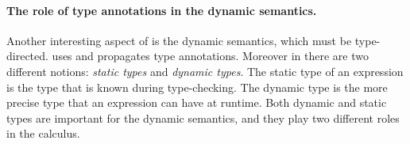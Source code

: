 \begin{comment}
The set representation is justified by the distributivity in subtyping (Figure~\ref{}).
Every type in the set denotes a component in a union type.
That is to say, any inhabited type must have an equivalent union type,
except for literal types.
Only with distributivity, we have $[[(A\/B)/\C]]$ equivalent to
$[[(A/\C)\/(B/\C)]]$.
The soundness and completeness of the algorithmic definition is proved
with respect to the declarative definition.
Same applies to the two definitions for \cal without intersection.


\paragraph{Typing and exhaustiveness}
In \cal, a switch expression has two branches. For multiple cases,
one can write nested switch expression.
We assume the two branches expect $[[A]]$ and $[[B]]$.
To make sure they exhaust all possible types of the switched term $[[e]]$,
there is a premise that $[[e]]$ can be checked by $[[A\/B]]$.
\verb|<=| stands for checking mode in bidirectional typing,
on contrary to inference mode.
In other words, the inferred type of $[[e]]$ should be a subtype of $[[A\/B]]$,
like $[[Int]]$ to $[[Int\/Char]]$.
%
\begin{mathpar}
	\ottdruletypXXswitch{}
\end{mathpar}
%
Another premise requires the two cases to be disjoint.
Besides, the two branches are typed under different assumption of the bound
variable. Although the same type $[[C]]$ is used for both of them in the rule,
it does not prevent them to return different types.
Assuming the inferred type of $[[e1]]$ is $[[C1]]$ and the inferred type of
$[[e2]]$ is $[[C2]]$, we can make $[[C]]$ to be $[[C1\/C2]]$.
\end{comment}

\paragraph{The role of type annotations in the dynamic semantics.}
Another interesting aspect of \name is the dynamic semantics, which must be type-directed.
\name uses and propagates type annotations. Moreover in \name there are two different
notions: \emph{static types} and \emph{dynamic types}. The static type of an
expression is the type that is known during type-checking. The dynamic type is the
more precise type that an expression can have at runtime. Both dynamic and static
types are important for the dynamic semantics, and they
play two different roles in the calculus.

